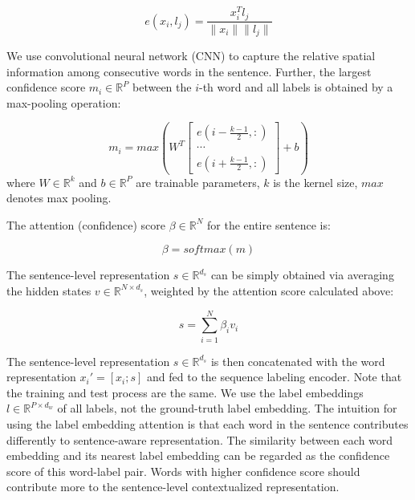 \documentclass[letterpaper]{article} \usepackage{aaai20}  \usepackage{times}  \usepackage{helvet} \usepackage{courier}  \usepackage[hyphens]{url}  \usepackage{graphicx} \urlstyle{rm} \def\UrlFont{\rm}  \usepackage{graphicx}  \frenchspacing  \setlength{\pdfpagewidth}{8.5in}  \setlength{\pdfpageheight}{11in}
\begin{document}
\begin{equation}
    e(x_i, l_j) = \frac{x_i^Tl_j}{\|x_i\|\|l_j \|}
\end{equation}

We use convolutional neural network (CNN) to capture the relative spatial information among consecutive words in the sentence. Further, the largest confidence score $m_i  \in \mathbb{R} ^{P} $ between the $i$-th word and all labels is obtained by a max-pooling operation:

\begin{equation}
    m_i = max(W^T\left[
    \begin{array}{c}
      e(i - \frac{k-1}{2}, :) \\
      \cdots \\
     e(i + \frac{k-1}{2}, :)
    \end{array}
\right] + b)
\end{equation} 
where $W \in \mathbb{R} ^{k} $ and $b \in \mathbb{R} ^{P}$ are trainable parameters, $k$ is the kernel size, $max$ denotes max pooling.

The attention (confidence) score $\beta \in \mathbb{R} ^{N} $ for the entire sentence is:

\begin{equation}
\beta =  softmax(m)
\end{equation}

The sentence-level representation $s \in \mathbb{R} ^{d_s}$ can be simply obtained via averaging the hidden states $v \in \mathbb{R} ^{N \times d_s}$, weighted by the attention score calculated above:

\begin{equation}
    s = \sum_{i=1}^N\beta_iv_i
\end{equation}

The sentence-level representation $s \in \mathbb{R} ^{d_s} $ is then concatenated with the word representation $x_i' = [x_i; s]$ and fed to the sequence labeling encoder.
Note that the training and test process are the same. We use the label embeddings $l \in \mathbb{R}^{P \times d_w}$ of all labels, not the ground-truth label embedding.
The intuition for using the label embedding attention is that each word in the sentence contributes differently to sentence-aware representation. The similarity between each word embedding and its nearest label embedding can be regarded as the confidence score of this word-label pair. Words with higher confidence score should contribute more to the sentence-level contextualized representation. 
\end{document}
